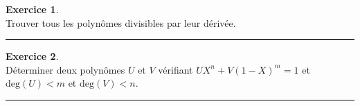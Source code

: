 \documentclass[a4paper,10pt]{article}
\theoremstyle{definition}
\theoremstyle{definition}
\newtheorem{exo}{Exercice}
\begin{document}
\begin{minipage}{1\linewidth}
\begin{minipage}[t]{0.48\linewidth}
\begin{exo}\quad\\
Trouver tous les polynômes divisibles par leur dérivée.

\centering\rule{1\linewidth}{0.6pt}
\end{exo}

\begin{exo}\quad\\

Déterminer deux polynômes $U$ et $V$ vérifiant $UX^n+V(1-X)^m=1$ et $\mbox{deg}(U)<m$ et $\mbox{deg}(V)<n$.

\centering\rule{1\linewidth}{0.6pt}
\end{exo}







\end{minipage}
\end{minipage}
\end{document}
